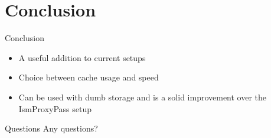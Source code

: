 \documentclass[xcolor=svgnames,handout]{beamer}
\begin{document}
\section{Conclusion}

\begin{frame}{Conclusion}
  \begin{itemize}
      \item A useful addition to current setups
      \item Choice between cache usage and speed
      \item Can be used with dumb storage and is a solid improvement over the
          IsmProxyPass setup
  \end{itemize}
\end{frame}


\begin{frame}{Questions}
    Any questions?


\end{frame}
\end{document}
